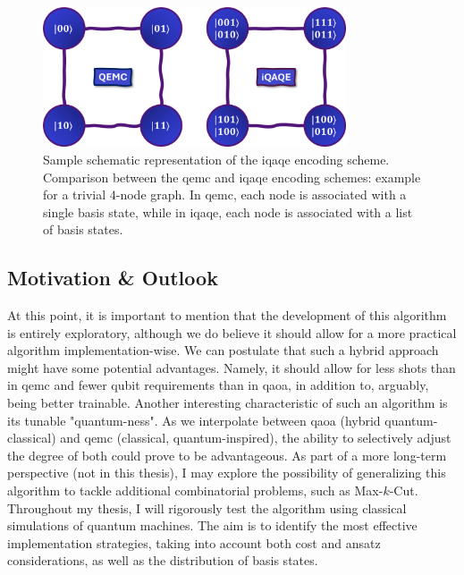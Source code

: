 \begin{figure}[H]
    \centering
    \includegraphics[width=0.8\textwidth]{Figures/Diagrams/QEMC_iQAQE_Encodings.png}
    \caption{Sample schematic representation of the \acrshort{iqaqe} encoding scheme. Comparison between the \acrshort{qemc} and \acrshort{iqaqe} encoding schemes: example for a trivial $4$-node graph. In \acrshort{qemc}, each node is associated with a single basis state, while in \acrshort{iqaqe}, each node is associated with a list of basis states.}
\label{fig:iQAQE_Encoding}
\end{figure}

\subsection{Motivation \& Outlook}
\label{subsection:iQAQE Motivation}
At this point, it is important to mention that the development of this algorithm is entirely exploratory, although we do believe it should allow for a more practical algorithm implementation-wise. We can postulate that such a hybrid approach might have some potential advantages. Namely, it should allow for less shots than in \acrshort{qemc} and fewer qubit requirements than in \acrshort{qaoa}, in addition to, arguably, being better trainable. Another interesting characteristic of such an algorithm is its tunable "quantum-ness". As we interpolate between \acrshort{qaoa} (hybrid quantum-classical) and \acrshort{qemc} (classical, quantum-inspired), the ability to selectively adjust the degree of both could prove to be advantageous. As part of a more long-term perspective (not in this thesis), I may explore the possibility of generalizing this algorithm to tackle additional combinatorial problems, such as Max-$k$-Cut. Throughout my thesis, I will rigorously test the algorithm using classical simulations of quantum machines. The aim is to identify the most effective implementation strategies, taking into account both cost and ansatz considerations, as well as the distribution of basis states.

